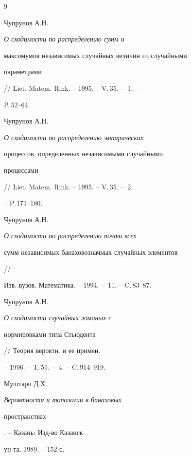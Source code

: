\begin{thebibliography}{9} 


 




Чупрунов А.Н. {\em О сходимости по распределению сумм и 


максимумов независимых случайных величин со случайными 


параметрами} // Liet. Matem. Rink. -- 1995. -- V.\,35. -- \No\,1. --


P.\,52--64. 




Чупрунов А.Н. {\em О сходимости по распределению эмпирических 


процессов, определенных независимыми случайными 


процессами} // Liet. Matem. Rink. -- 1995. -- V.\,35. -- \No\,2. 


-- P.\,171--180. 




Чупрунов А.Н. {\em О сходимости по распределению почти всех 


сумм независимых банаховозначных случайных элементов} // 


Изв. вузов. Математика. -- 1994. -- \No\,11. -- C.\,83--87. 




Чупрунов А.Н. {\em О сходимости случайных ломаных с 


нормировками типа Стьюдента} // Теория вероятн. и ее примен. 


-- 1996. -- T.\,51. -- \No\,4. -- C.\,914--919. 




Муштари Д.Х. {\em Вероятности и топологии в банаховых 


пространствах}. -- Казань: Изд-во Казанск. 


ун-та, 1989. -- 152 с. 


 


\end{thebibliography} 


 


\vskip 2cm 


 






 


\label{end} 


 


